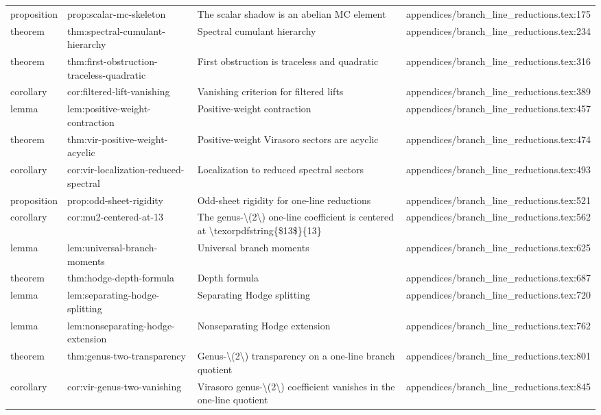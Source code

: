 \documentclass[11pt]{article}
\begin{document}
\begin{longtable}{L{0.10\textwidth}L{0.26\textwidth}L{0.42\textwidth}L{0.22\textwidth}}
proposition & prop:scalar-mc-skeleton & The scalar shadow is an abelian MC element & appendices/branch\_line\_reductions.tex:175\\
theorem & thm:spectral-cumulant-hierarchy & Spectral cumulant hierarchy & appendices/branch\_line\_reductions.tex:234\\
theorem & thm:first-obstruction-traceless-quadratic & First obstruction is traceless and quadratic & appendices/branch\_line\_reductions.tex:316\\
corollary & cor:filtered-lift-vanishing & Vanishing criterion for filtered lifts & appendices/branch\_line\_reductions.tex:389\\
lemma & lem:positive-weight-contraction & Positive-weight contraction & appendices/branch\_line\_reductions.tex:457\\
theorem & thm:vir-positive-weight-acyclic & Positive-weight Virasoro sectors are acyclic & appendices/branch\_line\_reductions.tex:474\\
corollary & cor:vir-localization-reduced-spectral & Localization to reduced spectral sectors & appendices/branch\_line\_reductions.tex:493\\
proposition & prop:odd-sheet-rigidity & Odd-sheet rigidity for one-line reductions & appendices/branch\_line\_reductions.tex:521\\
corollary & cor:mu2-centered-at-13 & The genus-\textbackslash{}(2\textbackslash{}) one-line coefficient is centered at \textbackslash{}texorpdfstring\{\$13\$\}\{13\} & appendices/branch\_line\_reductions.tex:562\\
lemma & lem:universal-branch-moments & Universal branch moments & appendices/branch\_line\_reductions.tex:625\\
theorem & thm:hodge-depth-formula & Depth formula & appendices/branch\_line\_reductions.tex:687\\
lemma & lem:separating-hodge-splitting & Separating Hodge splitting & appendices/branch\_line\_reductions.tex:720\\
lemma & lem:nonseparating-hodge-extension & Nonseparating Hodge extension & appendices/branch\_line\_reductions.tex:762\\
theorem & thm:genus-two-transparency & Genus-\textbackslash{}(2\textbackslash{}) transparency on a one-line branch quotient & appendices/branch\_line\_reductions.tex:801\\
corollary & cor:vir-genus-two-vanishing & Virasoro genus-\textbackslash{}(2\textbackslash{}) coefficient vanishes in the one-line quotient & appendices/branch\_line\_reductions.tex:845\\

\end{longtable}
\end{document}
